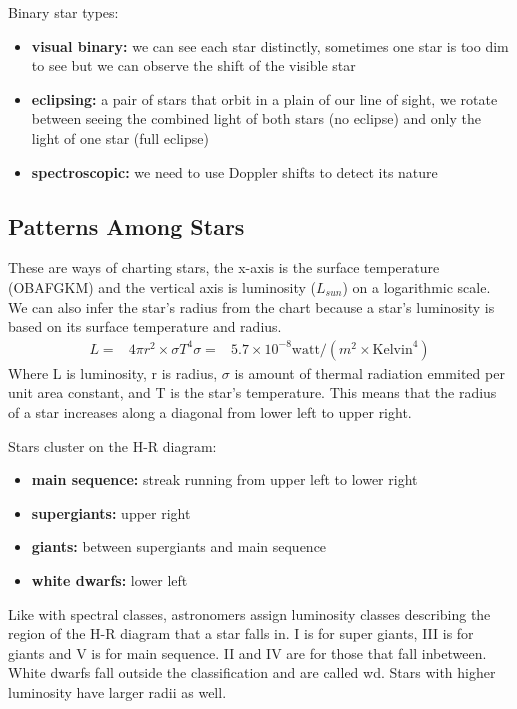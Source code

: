 Binary star types:
\begin{itemize}
\item \textbf{visual binary: } we can see each star distinctly, sometimes one star is too dim to see but we can observe the shift of the visible star
\item \textbf{eclipsing: }  a pair of stars that orbit in a plain of our line of sight, we rotate between seeing the combined light of both stars (no eclipse) and only the light of one star (full eclipse)
\item \textbf{spectroscopic: } we need to use Doppler shifts to detect its nature
\end{itemize}

\subsection{Patterns Among Stars}
These are ways of charting stars, the x-axis is the surface temperature (OBAFGKM) and the vertical axis is luminosity ($L_{sun}$) on a logarithmic scale. We can also infer the star's radius from the chart because a star's luminosity is based on its surface temperature and radius.
\begin{align*}
L = & 4\pi r^2 \times \sigma T^4
\sigma = & 5.7 \times 10^{-8}\text{watt}/(m^2 \times \text{Kelvin}^4)
\end{align*}
Where L is luminosity, r is radius, $\sigma$ is amount of thermal radiation emmited per unit area constant, and T is the star's temperature. This means that the radius of a star increases along a diagonal from lower left to upper right.

Stars cluster on the H-R diagram:
\begin{itemize}
\item \textbf{main sequence: }streak running from upper left to lower right
\item \textbf{supergiants: }upper right
\item \textbf{giants: }between supergiants and main sequence
\item \textbf{white dwarfs: }lower left
\end{itemize}

Like with spectral classes, astronomers assign luminosity classes describing the region of the H-R diagram that a star falls in. I is for super giants, III is for giants and V is for main sequence. II and IV are for those that fall inbetween. White dwarfs fall outside the classification and are called wd. Stars with higher luminosity have larger radii as well.

